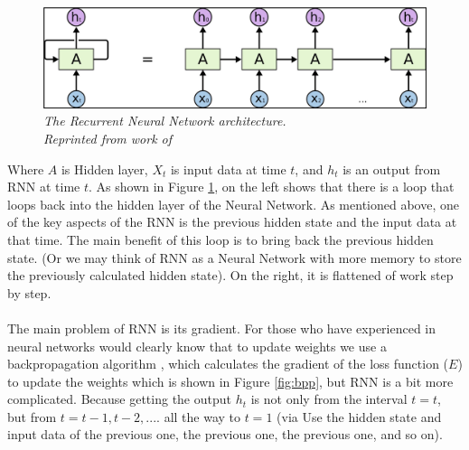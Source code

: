 \begin{figure}[H]
  \centering
   \caption[The Recurrent Neural Network architecture.]{\emph{The Recurrent Neural Network architecture. \\ 
   Reprinted from work of \citeauthor{olah_2015} \citeyear{olah_2015}}}\label{fig:RNN}
  \includegraphics[scale = 0.2]{figures/RNN.jpg}  
\end{figure}

Where $A$ is Hidden layer, $X_t$ is input data at time $t$, and $h_t$ is an output from RNN at time $t$. As shown in Figure \ref{fig:RNN}, on the left shows that there is a loop that loops back into the hidden layer of the Neural Network. As mentioned above, one of the key aspects of the RNN is the previous hidden state and the input data at that time. The main benefit of this loop is to bring back the previous hidden state. (Or we may think of RNN as a Neural Network with more memory to store the previously calculated hidden state). On the right, it is flattened of work step by step.

\paragraph{}
The main problem of RNN is its gradient. For those who have experienced in neural networks would clearly know that to update weights we use a backpropagation algorithm \cite{arnx_2019}, which calculates the gradient of the loss function ($E$) to update the weights which is shown in Figure \ref{fig:bpp}, but RNN is a bit more complicated. Because getting the output $h_t$ is not only from the interval $t=t$, but from $t=t-1, t-2, ....$ all the way to $t=1$ (via Use the hidden state and input data of the previous one, the previous one, the previous one, and so on).

